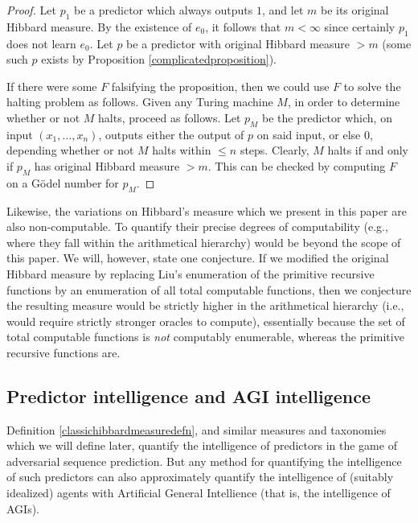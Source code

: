 \documentclass[twoside,11pt]{article}
\begin{document}
\begin{proof}
    Let $p_1$ be a predictor which always outputs $1$, and let $m$ be its
    original Hibbard measure. By the existence of $e_0$, it
    follows that $m<\infty$ since certainly $p_1$ does not learn $e_0$.
    Let $p$ be a predictor with
    original Hibbard measure $>m$
    (some such $p$ exists by Proposition \ref{complicatedproposition}).

    If there were some $F$ falsifying the proposition, then we could use $F$ to solve
    the halting problem as follows.
    Given any Turing machine $M$, in order to determine whether or not $M$ halts,
    proceed as follows. Let $p_M$ be the predictor which, on
    input $(x_1,\ldots,x_n)$, outputs either the output of $p$ on said input,
    or else $0$, depending whether or not $M$ halts within
    $\leq n$ steps. Clearly, $M$ halts if and only if $p_M$ has
    original Hibbard measure $>m$. This can be checked by computing $F$ on a
    G\"odel number for $p_M$.
\end{proof}

Likewise, the variations on Hibbard's measure which we present in this paper are also
non-computable. To quantify their precise degrees of computability (e.g., where they
fall within the arithmetical hierarchy) would be beyond the scope of this paper.
We will, however, state one conjecture. If we modified the original Hibbard
measure by replacing Liu's enumeration of the primitive recursive functions by an
enumeration of all total computable functions, then we conjecture the resulting measure would
be strictly higher in the arithmetical hierarchy (i.e., would require strictly
stronger oracles to compute), essentially because the set of total computable functions
is \emph{not} computably enumerable, whereas the primitive recursive functions are.

\subsection{Predictor intelligence and AGI intelligence}
\label{agiproxysection}

Definition \ref{classichibbardmeasuredefn}, and similar measures and taxonomies
which we will
define later, quantify the intelligence of predictors in the game of
adversarial sequence prediction.
But any method for quantifying the intelligence of such predictors can also
approximately quantify the intelligence of (suitably idealized)
agents with Artificial General Intellience (that is, the intelligence of AGIs).
\end{document}
